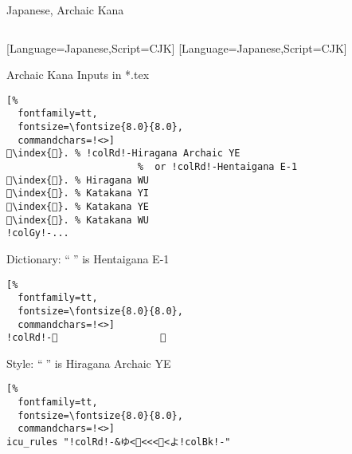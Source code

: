\documentclass[aspectratio=169,10pt]{beamer}
\begin{document}

\begin{frame}[fragile]{Japanese, Archaic Kana}

\begin{columns}
\begin{column}{55mm}

\setmonofont{mkanaplus-regular.ttf}[Language=Japanese,Script=CJK]
\setsansfont{mkanaplus-regular.ttf}[Language=Japanese,Script=CJK]
\begin{exampleblock}{Archaic Kana Inputs in *.tex}
\begin{Verbatim}[%
  fontfamily=tt,
  fontsize=\fontsize{8.0}{8.0},
  commandchars=!<>]
𛀁\index{𛀁}. % !colRd!-Hiragana Archaic YE
                       %  or !colRd!-Hentaigana E-1
𛄟\index{𛄟}. % Hiragana WU
𛄠\index{𛄠}. % Katakana YI
𛄡\index{𛄡}. % Katakana YE
𛄢\index{𛄢}. % Katakana WU
!colGy!-...
\end{Verbatim}
\end{exampleblock}
\begin{exampleblock}{Dictionary: \footnotesize ``𛀁'' is Hentaigana E-1}
\begin{Verbatim}[%
  fontfamily=tt,
  fontsize=\fontsize{8.0}{8.0},
  commandchars=!<>]
!colRd!-𛀁                  え
\end{Verbatim}
\end{exampleblock}
\begin{exampleblock}{Style: \footnotesize ``𛀁'' is Hiragana Archaic YE}
\begin{Verbatim}[%
  fontfamily=tt,
  fontsize=\fontsize{8.0}{8.0},
  commandchars=!<>]
icu_rules "!colRd!-&ゆ<𛀁<<<𛄡<よ!colBk!-"
\end{Verbatim}
\end{exampleblock}
\end{column}

\begin{column}{38mm}
\begin{center}
\end{center}
\end{column}

\begin{column}{38mm}
\begin{center}
\end{center}
\end{column}
\end{columns}

\end{frame}
\end{document}
